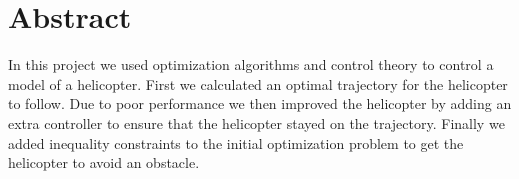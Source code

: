 
\section{Abstract}

In this project we used optimization algorithms and control theory to control a model of a helicopter. First we calculated an optimal trajectory for the helicopter to follow. Due to poor performance we then improved the helicopter by adding an extra controller to ensure that the helicopter stayed on the trajectory. Finally we added inequality constraints to the initial optimization problem to get the helicopter to avoid an obstacle. 
